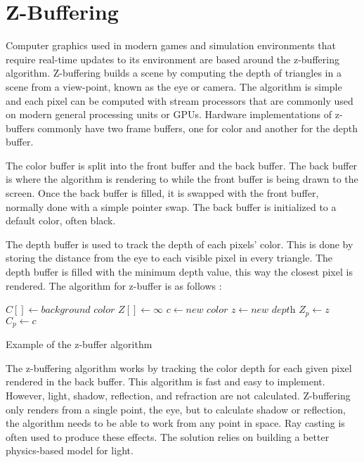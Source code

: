 \section{Z-Buffering}

Computer graphics used in modern games and simulation environments that require real-time updates to its environment are based around the z-buffering algorithm.  Z-buffering builds a scene by computing the depth of triangles in a scene from a view-point,  known as the eye or camera.  The algorithm is simple and each pixel can be computed with stream processors that are commonly  used on modern general processing units or GPUs.  Hardware implementations of z-buffers commonly have two frame buffers, one for color and another for the depth buffer.   

 The color buffer is split into the front buffer and the back buffer.  The back buffer is where the algorithm is rendering to while the front buffer is being drawn to the screen.  Once the back buffer is filled, it is swapped with the front buffer,  normally done with a simple pointer swap.  The back buffer is initialized to a default color, often black.
 
 The depth buffer is used to track the depth of each pixels' color.  This is done by storing the distance from the eye to each visible pixel in every triangle.  The depth buffer is filled with the minimum depth value, this way the closest pixel is rendered.  The algorithm for z-buffer is as follows \cite{fast:2008}:

\begin{algorithm}
\begin{algorithmic}[1]
\STATE $C[ ] \gets \textit{background color}$ 
\STATE $Z[ ] \gets \infty$
		\STATE $c \gets \textit{new color}$
		\STATE $z \gets \textit{new depth}$
			\STATE $Z_{p} \gets z$
			\STATE $C_{p} \gets c$
		\ENDIF
	\ENDFOR
\ENDFOR
\end{algorithmic}
\caption{Example of the z-buffer algorithm}
\label{z-buffer}
\end{algorithm}

The z-buffering algorithm works by tracking the color depth for each given pixel rendered in the back buffer.  This algorithm is fast and easy to implement.  However, light, shadow, reflection, and refraction are not calculated.   Z-buffering only renders from a single point, the eye, but to calculate shadow or reflection, the algorithm needs to be able to work from any point in space.  Ray casting is often used to produce these effects.  The solution relies on building a better physics-based model for light.
